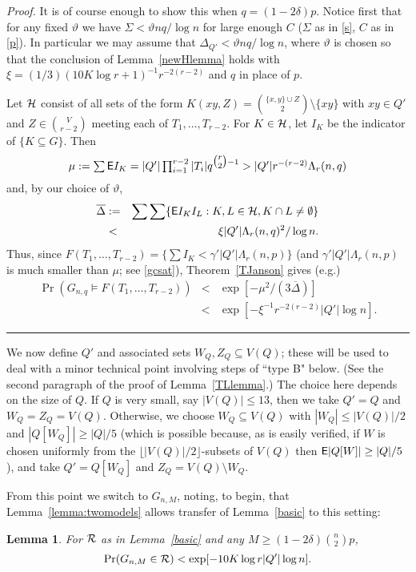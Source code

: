 \documentclass[letterpaper,11pt]{article}
\newtheorem{lemma}[thm]{Lemma}
\newcommand{\mn}[0]{\medskip\noindent}
\newcommand{\sub}[0]{\subseteq}
\newcommand{\sm}[0]{\setminus}
\renewcommand{\dots}[0]{,\ldots,}
\newcommand{\ov}[0]{\overline}
\newcommand{\h}[0]{{\cal H}}
\newcommand{\R}[0]{{\cal R}}
\newcommand{\0}[0]{\emptyset}
\renewcommand{\qed}[0]{\begin{flushright} \rule{2mm}{3mm} \end{flushright}}
\newcommand{\C}[2]{{{#1}\choose{{#2}}}}
\newcommand{\Cc}[0]{\tbinom}
\newcommand{\gc}[0]{\gamma }
\newcommand{\gd}[0]{\delta }
\newcommand{\gD}[0]{\Delta }
\newcommand{\gL}[0]{\Lambda}
\newcommand{\gS}[0]{\Sigma}
\newcommand{\vt}[0]{\vartheta}
\newcommand{\glq}[0]{\gL_r(n,q)}
\begin{document}
\mn
{\em Proof.}
It is of course enough to show this when $q=(1-2\gd )p$.
Notice first that for any fixed $\vt$ we have $\gS< \vt nq/\log n$
for large enough $C$ ($\gS$ as in \eqref{s},
$C$ as in \eqref{p}).
In particular we may assume that $\gD_{Q'} < \vt nq/\log n$,
where $\vt$ is chosen so that the conclusion of
Lemma~\ref{newHlemma} holds with
$\xi = (1/3)(10K\log r+1)^{-1}r^{-2(r-2)}$
and $q$ in place of $p$.


\medskip
Let $\h$ consist of all
sets of the form $K(xy,Z) = \C{\{x,y\}\cup Z}{2}\sm \{xy\}$
with $xy\in Q'$ and $Z\in \C{V}{r-2}$ meeting each of
$T_1\dots T_{r-2}$.  For $K\in \h$,
let $I_K$ be the indicator of $\{K\sub G\}$.
Then
\[
\mbox{$\mu:=\sum \E I_K
= |Q'|\prod_{i=1}^{r-2}|T_i|q^{\Cc{r}{2}-1}
>|Q'|r^{-(r-2)}\glq$}
\]
and, by our choice of $\vt$,
\begin{eqnarray}
\ov{\gD}&:=&\sum\sum \{\E I_KI_L:K,L\in \h, K\cap L\neq \0\}
\nonumber\\
&<& \xi|Q'|\glq^2/\log n.\label{ovgD'}
\end{eqnarray}
Thus, since
$F(T_1\dots T_{r-2})=\{\sum I_K< \gc' |Q'|\gL_r(n,p)\}$
(and $\gc' |Q'|\gL_r(n,p)$ is much smaller than $\mu$;
see \eqref{gcsat}),
Theorem~\ref{TJanson} gives (e.g.)
\begin{eqnarray*}
\Pr(G_{n,q}\models
F(T_1\dots T_{r-2}))& < &\exp[-\mu^2/(3\ov{\gD})]\\
&<& \exp[-\xi^{-1}r^{-2(r-2)}|Q'|\log n].
\end{eqnarray*}\qed



\medskip
We now define $Q'$ and associated sets $W_Q,Z_Q\sub V(Q)$;
these will be used to deal with a minor technical point
involving steps of ``type B" below.
(See the second paragraph of the proof of Lemma~\ref{TLlemma}.)
The choice here depends on the size of $Q$.
If $Q$ is very small, say
$|V(Q)|\leq 13$, then we take $Q'=Q$ and $W_Q=Z_Q=V(Q)$.
Otherwise, we choose $W_Q\sub V(Q)$
with $|W_Q|\leq |V(Q)|/2$ and
$|Q[W_Q]|\geq |Q|/5$
(which is possible because, as is easily verified,
if $W$ is chosen uniformly
from the $\lfloor |V(Q)|/2\rfloor$-subsets of $V(Q)$ then
${\sf E} |Q[W]|\geq |Q|/5$), and
take $Q'=Q[W_Q]$
and $Z_Q=V(Q)\sm W_Q$.








\medskip
From this point we switch to $G_{n,M}$, noting, to begin, that
Lemma~\ref{lemma:twomodels} allows transfer of
Lemma~\ref{basic} to this setting:
\begin{lemma}\label{basic''}
For $\R$ as in Lemma~\ref{basic} and
any $M\geq (1-2\gd)\C{n}{2}p$,
\[\Pr(G_{n,M}\in \R) <\exp[-10K\log r|Q'|\log n].\]
\end{lemma}
\end{document}
